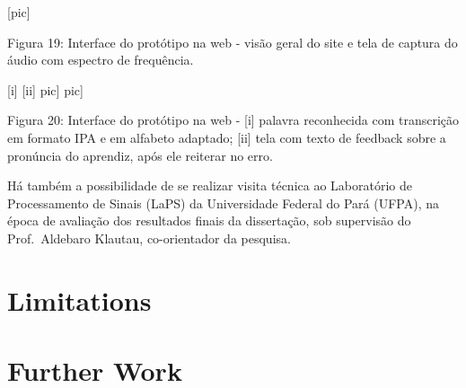                                 [pic]

Figura 19: Interface do prot\'otipo na web - vis\~ao geral do site e tela de
captura do \'audio com espectro de frequ\^encia.

\textbar{} {[}i{]} \textbar{} {[}ii{]} \textbar{} \textbar{}{[}pic{]}
\textbar{}{[}pic{]} \textbar{}

Figura 20: Interface do prot\'otipo na web - {[}i{]} palavra reconhecida
com transcri\c{c}\~ao em formato IPA e em alfabeto adaptado; {[}ii{]} tela com
texto de feedback sobre a pron\'uncia do aprendiz, ap\'os ele reiterar no
erro.

H\'a tamb\'em a possibilidade de se realizar visita t\'ecnica ao Laborat\'orio
de Processamento de Sinais (LaPS) da Universidade Federal do Par\'a
(UFPA), na \'epoca de avalia\c{c}\~ao dos resultados finais da disserta\c{c}\~ao, sob
supervis\~ao do Prof.~Aldebaro Klautau, co-orientador da pesquisa.

\section*{Limitations}\label{sec:limitations}
\section*{Further Work}\label{sec:further-work}


